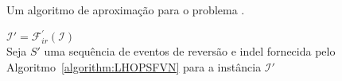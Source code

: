 \begin{algorithm}[!tbh]
  \caption{Um algoritmo de aproximação para o problema \SbFIRI{}.\label{algorithm:ODSKKWNP}}
  $\mathcal{I}' = \mathcal{F}_{ir}^{'}(\mathcal{I})$ \\
  Seja $S'$ uma sequência de eventos de reversão e indel fornecida pelo Algoritmo~\ref{algorithm:LHOPSFVN} para a instância $\mathcal{I}'$ \\
\end{algorithm}